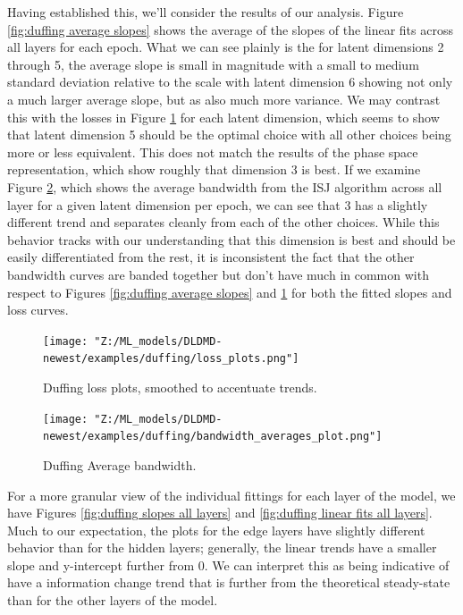 Having established this, we'll consider the results of our analysis.
Figure \ref{fig:duffing average slopes} shows the average of the slopes of the linear fits across 
all layers for each epoch.  What we can see plainly is the for latent dimensions 2 through 5, the average
slope is small in magnitude with a small to medium standard deviation relative to the scale with
latent dimension 6 showing not only a much larger average slope, but as also much more variance. We may 
contrast this with the losses in Figure \ref{fig:duffing losses} for each latent dimension, which seems 
to show that latent dimension 5 should be the optimal choice with all other choices being more or less 
equivalent. This does not match the results of the phase space representation, which show roughly that 
dimension 3 is best. 
If we examine Figure \ref{fig:duffing average bandwidth}, which shows the average bandwidth from the ISJ
algorithm across all layer for a given latent dimension per epoch, we can see that 3 has a slightly
different trend and separates cleanly from each of the other choices. While this behavior tracks with our 
understanding that this dimension is best and should be easily differentiated from the rest, it is 
inconsistent the fact that the other bandwidth curves are banded together but don't have much in common
with respect to Figures \ref{fig:duffing average slopes} and \ref{fig:duffing losses}
for both the fitted slopes and loss curves.


\begin{figure}[ht]
    \centering
    \begin{minipage}{\textwidth}
        \texttt{[image: "Z:/ML\_models/DLDMD-newest/examples/duffing/loss\_plots.png"]} 
    \end{minipage}%
    \caption{Duffing loss plots, smoothed to accentuate trends.}
    \label{fig:duffing losses}
\end{figure}

\begin{figure}[ht]
    \centering
    \begin{minipage}{\textwidth}
        \texttt{[image: "Z:/ML\_models/DLDMD-newest/examples/duffing/bandwidth\_averages\_plot.png"]} 
    \end{minipage} 
    \caption{Duffing Average bandwidth.}
    \label{fig:duffing average bandwidth}
\end{figure}

For a more granular view of the individual fittings for each layer of the model, we have Figures 
\ref{fig:duffing slopes all layers} and \ref{fig:duffing linear fits all layers}. Much to our 
expectation, the plots for the edge layers have slightly different behavior than for the hidden layers;
generally, the linear trends have a smaller slope and y-intercept further from 0. We can interpret this 
as being indicative of have a information change trend that is further from the theoretical steady-state
than for the other layers of the model. 


